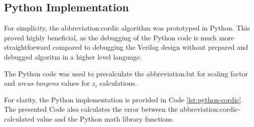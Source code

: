 \documentclass[a4paper, twoside, 11pt]{article}
\begin{document}
    \subsection{Python Implementation}\label{subsec:cordic-python-implementation}
        For simplicity, the \gls{abbreviation:cordic} algorithm was prototyped in Python. This proved highly beneficial, as the debugging of the Python code is much more straightforward compared to debugging the Verilog design without prepared and debugged algoritm in a higher level language.\par
        The Python code was used to precalculate the \gls{abbreviation:lut} for scaling factor and \textit{arcus tangens} values for $z_i$ calculations.\par
        For clarity, the Python implementation is provided in Code \ref{lst:python-cordic}. The presented Code also calculates the error between the \gls{abbreviation:cordic}-calculated value and the Python math library functions.
\end{document}
